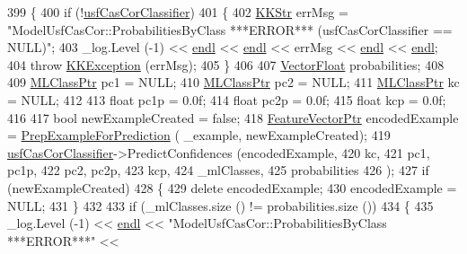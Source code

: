 \begin{DoxyCode}
399 \{
400   \textcolor{keywordflow}{if}  (!\hyperlink{class_k_k_m_l_l_1_1_model_usf_cas_cor_a7aeb7274e64e73ccfeea3a9da6633d60}{usfCasCorClassifier})
401   \{
402     \hyperlink{class_k_k_b_1_1_k_k_str}{KKStr} errMsg = \textcolor{stringliteral}{"ModelUsfCasCor::ProbabilitiesByClass   ***ERROR***      (usfCasCorClassifier ==
       NULL)"};
403     \_log.Level (-1) << \hyperlink{namespace_k_k_b_ad1f50f65af6adc8fa9e6f62d007818a8}{endl} << \hyperlink{namespace_k_k_b_ad1f50f65af6adc8fa9e6f62d007818a8}{endl} << errMsg << \hyperlink{namespace_k_k_b_ad1f50f65af6adc8fa9e6f62d007818a8}{endl} << \hyperlink{namespace_k_k_b_ad1f50f65af6adc8fa9e6f62d007818a8}{endl};
404     \textcolor{keywordflow}{throw} \hyperlink{class_k_k_b_1_1_k_k_exception}{KKException} (errMsg);
405   \}
406 
407   \hyperlink{namespace_k_k_b_a4820c3670ee1fe74f0c4de981c600faf}{VectorFloat}  probabilities;
408 
409   \hyperlink{class_k_k_m_l_l_1_1_m_l_class}{MLClassPtr}  pc1 = NULL;
410   \hyperlink{class_k_k_m_l_l_1_1_m_l_class}{MLClassPtr}  pc2 = NULL;
411   \hyperlink{class_k_k_m_l_l_1_1_m_l_class}{MLClassPtr}  kc  = NULL;
412 
413   \textcolor{keywordtype}{float}  pc1p = 0.0f;
414   \textcolor{keywordtype}{float}  pc2p = 0.0f;
415   \textcolor{keywordtype}{float}  kcp  = 0.0f;
416 
417   \textcolor{keywordtype}{bool}  newExampleCreated = \textcolor{keyword}{false};
418   \hyperlink{class_k_k_m_l_l_1_1_feature_vector}{FeatureVectorPtr}  encodedExample = \hyperlink{class_k_k_m_l_l_1_1_model_a31b972adfb64769b3ae966debec824fd}{PrepExampleForPrediction} (
      \_example, newExampleCreated);
419   \hyperlink{class_k_k_m_l_l_1_1_model_usf_cas_cor_a7aeb7274e64e73ccfeea3a9da6633d60}{usfCasCorClassifier}->PredictConfidences (encodedExample,
420                                            kc,
421                                            pc1, pc1p, 
422                                            pc2, pc2p,
423                                            kcp,
424                                            \_mlClasses,
425                                            probabilities
426                                           );
427   \textcolor{keywordflow}{if}  (newExampleCreated)
428   \{
429     \textcolor{keyword}{delete} encodedExample;
430     encodedExample = NULL;
431   \}
432 
433   \textcolor{keywordflow}{if}  (\_mlClasses.size () != probabilities.size ())
434   \{
435     \_log.Level (-1) << \hyperlink{namespace_k_k_b_ad1f50f65af6adc8fa9e6f62d007818a8}{endl} << \textcolor{stringliteral}{"ModelUsfCasCor::ProbabilitiesByClass   ***ERROR***"}  << 

\end{DoxyCode}

